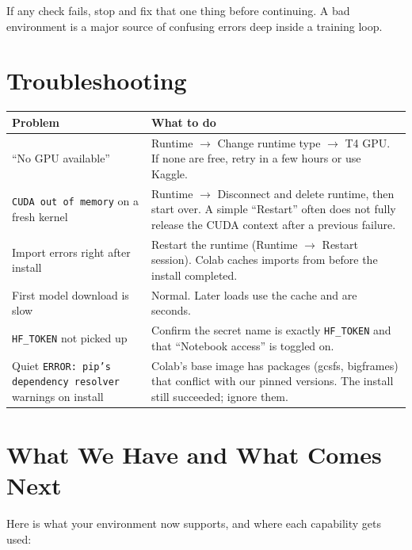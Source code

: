 \begin{chapterenv}
If any check fails, stop and fix that one thing before continuing. A bad environment is a major source of confusing errors deep inside a training loop.

\section{Troubleshooting}

\begin{center}
\begin{tabular}{p{}p{}}
\toprule
\textbf{Problem} & \textbf{What to do} \\
\midrule
``No GPU available'' & Runtime $\rightarrow$ Change runtime type $\rightarrow$ T4 GPU. If none are free, retry in a few hours or use Kaggle. \\
\texttt{CUDA out of memory} on a fresh kernel & Runtime $\rightarrow$ Disconnect and delete runtime, then start over. A simple ``Restart'' often does not fully release the CUDA context after a previous failure. \\
Import errors right after install & Restart the runtime (Runtime $\rightarrow$ Restart session). Colab caches imports from before the install completed. \\
First model download is slow & Normal. Later loads use the cache and are seconds. \\
\texttt{HF\_TOKEN} not picked up & Confirm the secret name is exactly \texttt{HF\_TOKEN} and that ``Notebook access'' is toggled on. \\
Quiet \texttt{ERROR: pip's dependency resolver} warnings on install & Colab's base image has packages (gcsfs, bigframes) that conflict with our pinned versions. The install still succeeded; ignore them. \\
\bottomrule
\end{tabular}
\end{center}

\section{What We Have and What Comes Next}

Here is what your environment now supports, and where each capability gets used:


\end{chapterenv}
